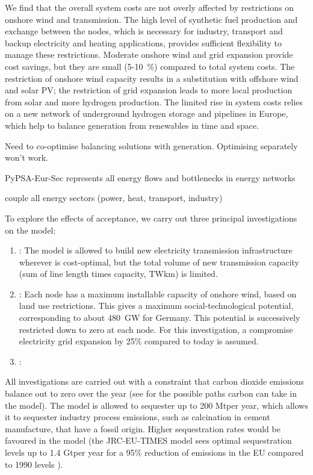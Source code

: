 We find that the overall system costs are not overly affected
by restrictions on onshore wind and transmission. The high level of
synthetic fuel production and exchange between the nodes, which is
necessary for industry, transport and backup electricity and heating
applications, provides sufficient flexibility to manage these
restrictions. Moderate onshore wind and grid expansion provide cost
savings, but they are small (5-10~\%) compared to total system
costs. The restriction of onshore wind capacity results in a
substitution with offshore wind and solar PV; the restriction of grid
expansion leads to more local production from solar and more hydrogen
production. The limited rise in system costs relies on a new network
of underground hydrogen storage and pipelines in Europe, which help to balance
generation from renewables in time and space.

Need to co-optimise balancing solutions with generation. Optimising separately won't work.

PyPSA-Eur-Sec represents all energy flows and bottlenecks in energy networks

couple all energy sectors (power, heat, transport, industry)

To explore the effects of acceptance, we carry out three principal investigations
on the model:

\begin{enumerate}
\item {}: The model is allowed to build new electricity
transmission infrastructure wherever is cost-optimal, but the total volume of new
transmission capacity (sum of line length times capacity, TWkm) is limited.

\item {}: Each node has a maximum installable capacity of onshore
wind, based on land use restrictions. This gives a maximum social-technological
potential, corresponding to about \SI{480}{\giga\watt} for Germany. This potential is
successively restricted down to zero at each node. For this investigation, a
compromise electricity grid expansion by 25\% compared to today is assumed.

\item {}:
\end{enumerate}

All investigations are carried out with a constraint that carbon dioxide
emissions balance out to zero over the year (see for
the possible paths carbon can take in the model). The model is allowed to
sequester up to 200 Mt\co per year, which allows it to sequester industry
process emissions, such as calcination in cement manufacture, that have a fossil
origin. Higher sequestration rates would be favoured in the model (the
JRC-EU-TIMES model sees optimal sequestration levels up to 1.4 Gt\co per year
for a 95\% reduction of \co emissions in the EU compared to 1990 levels
\cite{blancoPotentialHydrogen2018}).

